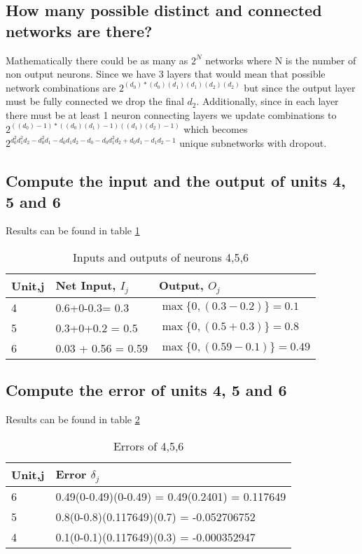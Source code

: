 \documentclass[11pt]{article}
\begin{document}
\subsection{How many possible distinct and connected networks are there?}
Mathematically there could be as many as $2^N$ networks where N is the number of non output neurons. Since we have 3 layers that would mean that possible network combinations are $2^{(d_0)*(d_0)(d_1)(d_1)(d_2)(d_2)}$ but since the output layer must be fully connected we drop the final $d_2$. Additionally, since in each layer there must be at least 1 neuron connecting layers we update combinations to $2^{((d_0)-1)*((d_0)(d_1)-1)((d_1)(d_2)-1)}$ which becomes $2^{d_{0}^2d_{1}^2d_{2}-d_0^2d_1-d_0d_1d_2-d_0-d_0d_1^2d_2+d_0d_1-d_1d_2-1}$ unique subnetworks with dropout.
\subsection{Compute the input and the output of units 4, 5 and 6}
Results can be found in table \ref{tab:outputs}
\begin{table}[]
\begin{tabular}{|l|l|l|} \hline
Unit,j & Net Input, $I_j$ & Output, $O_j$             \\ \hline 
4      & 0.6+0-0.3= 0.3   & $\max \{0,(0.3-0.2)\}=0.1$ \\  \hline
5      & 0.3+0+0.2 = 0.5  &  $\max \{0,(0.5+0.3)\}=0.8$ \\  \hline
6      & 0.03 + 0.56 = 0.59& $\max \{0,(0.59-0.1)\}=0.49$ \\  \hline
\end{tabular}
\caption{Inputs and outputs of neurons 4,5,6}
\label{tab:outputs}
\end{table}
\subsection{Compute the error of units 4, 5 and 6}
Results can be found in table \ref{tab:errors}
\begin{table}[]
\begin{tabular}{|l|l|} \hline
Unit,j & Error $\delta_j$ \\ \hline
6 & 0.49(0-0.49)(0-0.49) = 0.49(0.2401) = 0.117649 \\ \hline 
5 & 0.8(0-0.8)(0.117649)(0.7) = -0.052706752 \\ \hline 
4 & 0.1(0-0.1)(0.117649)(0.3) = -0.000352947 \\ \hline
\end{tabular}
\caption{Errors of  4,5,6}
\label{tab:errors}
\end{table}
\end{document}
